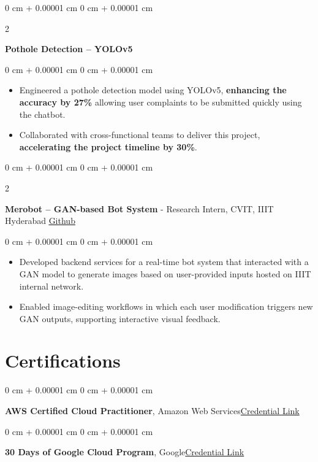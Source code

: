 \documentclass[10pt, a4paper]{article}
\newenvironment{highlights}{
    \begin{itemize}[
        topsep=0 cm,
        parsep=0 cm,
        partopsep=0pt,
        itemsep=0pt,
        leftmargin=0 cm + 10pt
    ]
}{
    \end{itemize}
} %
\newenvironment{onecolentry}{
    \begin{adjustwidth}{
        0 cm + 0.00001 cm
    }{
        0 cm + 0.00001 cm
    }
}{
    \end{adjustwidth}
} %
\newenvironment{twocolentry}[2][]{
    \onecolentry
    \def\secondColumn{#2}
    \setcolumnwidth{\fill, 6.0 cm}
    \begin{paracol}{2}
}{
    \switchcolumn \raggedleft \secondColumn
    \end{paracol}
    \endonecolentry
} %
\begin{document}
        \vspace{0.10 cm}

        \begin{twocolentry}{}
            \textbf{Pothole Detection – YOLOv5}\end{twocolentry}

        \vspace{0.10 cm}
        \begin{onecolentry}
            \begin{highlights}
                \item Engineered a pothole detection model using YOLOv5, \textbf{enhancing the accuracy by 27\%} allowing user complaints to be submitted quickly using the chatbot.
                \item Collaborated with cross-functional teams to deliver this project, \textbf{accelerating the project timeline by 30\%}.
            \end{highlights}
        \end{onecolentry}


        \vspace{0.10 cm}

        \begin{twocolentry}{
            \href{https://github.com/ammrit2312/Merobot/tree/master}{\underline{Github}}
        }
            \textbf{Merobot – GAN-based Bot System} - Research Intern, CVIT, IIIT Hyderabad\end{twocolentry}

        \vspace{0.10 cm}
        \begin{onecolentry}
            \begin{highlights}
                \item Developed backend services for a real-time bot system that interacted with a GAN model to generate images based on user-provided inputs hosted on IIIT internal network.
                \item Enabled image-editing workflows in which each user modification triggers new GAN outputs, supporting interactive visual feedback.
            \end{highlights}
        \end{onecolentry}

    \section{Certifications}

    \begin{onecolentry}
        \textbf{AWS Certified Cloud Practitioner}, Amazon Web Services\hfill \href{https://cp.certmetrics.com/amazon/en/public/verify/credential/21NY0Y6C714E1JSB}{Credential Link}
    \end{onecolentry}
    
    \begin{onecolentry}
        \textbf{30 Days of Google Cloud Program}, Google\hfill \href{https://drive.google.com/file/d/131IwLvWr8a6YWLYd5ILZ6kvacsKfmkWc/view}{Credential Link}
    \end{onecolentry}
    
\end{document}
